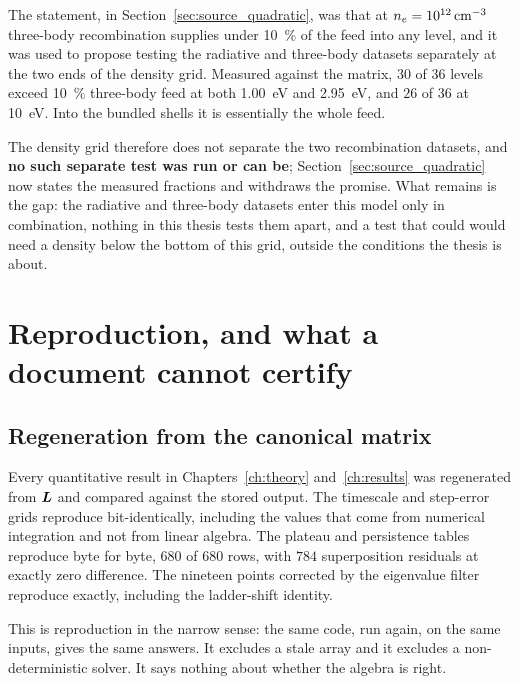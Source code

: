 The statement, in Section~\ref{sec:source_quadratic}, was that at
$n_e = \SI{e12}{\per\cubic\centi\metre}$ three-body recombination supplies
under \SI{10}{\percent} of the feed into any level, and it was used to propose
testing the radiative and three-body datasets separately at the two ends of the
density grid. Measured against the matrix, $30$ of $36$ levels exceed
\SI{10}{\percent} three-body feed at both \SI{1.00}{\electronvolt} and
\SI{2.95}{\electronvolt}, and $26$ of $36$ at \SI{10}{\electronvolt}. Into the
bundled shells it is essentially the whole feed.

The density grid therefore does not separate the two recombination datasets, and
\textbf{no such separate test was run or can be}; Section~\ref{sec:source_quadratic}
now states the measured fractions and withdraws the promise. What remains is the
gap: the radiative and three-body datasets enter this model only in combination,
nothing in this thesis tests them apart, and a test that could would need a
density below the bottom of this grid, outside the conditions the thesis is
about.

\section{Reproduction, and what a document cannot certify}
\label{sec:reproducibility}

\subsection{Regeneration from the canonical matrix}

Every quantitative result in Chapters~\ref{ch:theory} and~\ref{ch:results} was
regenerated from $\bm{L}$ and compared against the stored output. The timescale
and step-error grids reproduce bit-identically, including the values that come
from numerical integration and not from linear algebra. The plateau and persistence
tables reproduce byte for byte, $680$ of $680$ rows, with $784$ superposition
residuals at exactly zero difference. The nineteen points corrected by the
eigenvalue filter reproduce exactly, including the ladder-shift identity.

This is reproduction in the narrow sense: the same code, run again, on the same
inputs, gives the same answers. It excludes a stale array and it excludes a
non-deterministic solver. It says nothing about whether the algebra is right.

